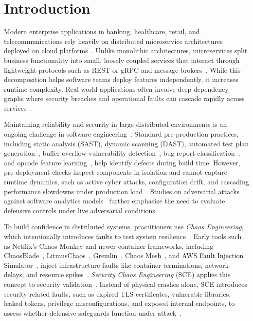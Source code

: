 \documentclass[ASNA,twocolumn]{USG}
\begin{document}
\maketitle

\section{Introduction}
\label{sec:introduction}

Modern enterprise applications in banking, healthcare, retail, and telecommunications rely heavily on distributed microservice architectures deployed on cloud platforms~\cite{basiri2016chaos, aderaldo2025declarative, soldani2023microservice}. Unlike monolithic architectures, microservices split business functionality into small, loosely coupled services that interact through lightweight protocols such as REST or gRPC and message brokers~\cite{taibi2021microservice, camacho2022chaos}. While this decomposition helps software teams deploy features independently, it increases runtime complexity. Real-world applications often involve deep dependency graphs where security breaches and operational faults can cascade rapidly across services~\cite{esen2025chaos, myrbakken2020security}.

Maintaining reliability and security in large distributed environments is an ongoing challenge in software engineering~\cite{brooker2025systems}. Standard pre-production practices, including static analysis (SAST), dynamic scanning (DAST), automated test plan generation~\cite{haldar2026testplan}, buffer overflow vulnerability detection~\cite{huang2026cotstatic}, bug report classification~\cite{du2024llmbrc}, and opcode feature learning~\cite{tong2026osel}, help identify defects during build time. However, pre-deployment checks inspect components in isolation and cannot capture runtime dynamics, such as active cyber attacks, configuration drift, and cascading performance slowdowns under production load~\cite{shortridge2023security, owotogbe2025chaos}. Studies on adversarial attacks against software analytics models~\cite{awal2025adversarial} further emphasize the need to evaluate defensive controls under live adversarial conditions.

To build confidence in distributed systems, practitioners use \textit{Chaos Engineering}, which intentionally introduces faults to test system resilience~\cite{basiri2016chaos, rosenthal2020chaos}. Early tools such as Netflix's Chaos Monkey and newer container frameworks, including ChaosBlade~\cite{chaosblade2021}, LitmusChaos~\cite{litmus2022}, Gremlin~\cite{gremlin2022}, Chaos Mesh~\cite{chaosmesh2021}, and AWS Fault Injection Simulator~\cite{awsfis2023}, inject infrastructure faults like container terminations, network delays, and resource spikes~\cite{camacho2022chaos, esen2025chaos, baghorn2022fault}. \textit{Security Chaos Engineering} (SCE) applies this concept to security validation~\cite{shortridge2023security, myrbakken2021security}. Instead of physical crashes alone, SCE introduces security-related faults, such as expired TLS certificates, vulnerable libraries, leaked tokens, privilege misconfigurations, and exposed internal endpoints, to assess whether defensive safeguards function under attack~\cite{myrbakken2021security, bedoya2024enhancing}.
\end{document}
